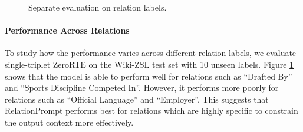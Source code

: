 \documentclass[11pt]{article}
\begin{document}
\begin{figure}
\centering
{}
\caption{Separate evaluation on relation labels.}
\label{fig:eval_by_label}
\end{figure}


%
 
\paragraph{Performance Across Relations}
To study how the performance varies across different relation labels, we evaluate single-triplet ZeroRTE on the Wiki-ZSL test set with 10 unseen labels.
Figure \ref{fig:eval_by_label} shows that the model is able to perform well for relations such as ``Drafted By'' and ``Sports Discipline Competed In''.
However, it performs more poorly for relations such as ``Official Language'' and ``Employer''.
This suggests that RelationPrompt performs best for relations which are highly specific to constrain the output context more effectively.
\end{document}
